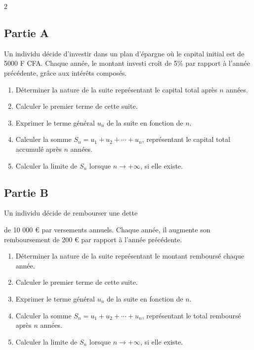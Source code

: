 \documentclass[12pt,a4paper]{article}
\begin{document}
\begin{multicols}{2}
\subsection*{Partie A}

Un individu décide d’investir dans un plan d’épargne où le capital initial est de 5000 F CFA. Chaque année, le montant investi croît de 5\% par rapport à l’année précédente, grâce aux intérêts composés.

\begin{enumerate}
    \item Déterminer la nature de la suite représentant le capital total après \(n\) années.
    \item Calculer le premier terme de cette suite.
    \item Exprimer le terme général \(u_n\) de la suite en fonction de \(n\).
    \item Calculer la somme \(S_n = u_1 + u_2 + \cdots + u_n\), représentant le capital total accumulé après \(n\) années.
    \item Calculer la limite de \(S_n\) lorsque \(n \to +\infty\), si elle existe.
\end{enumerate}

\subsection*{Partie B}

Un individu décide de rembourser une dette

de 10 000 € par versements annuels. Chaque année, il augmente son remboursement de 200 € par rapport à l’année précédente.

\begin{enumerate}
    \item Déterminer la nature de la suite représentant le montant remboursé chaque année.
    \item Calculer le premier terme de cette suite.
    \item Exprimer le terme général \(u_n\) de la suite en fonction de \(n\).
    \item Calculer la somme \(S_n = u_1 + u_2 + \cdots + u_n\), représentant le total remboursé après \(n\) années.
    \item Calculer la limite de \(S_n\) lorsque \(n \to +\infty\), si elle existe.
\end{enumerate} 
\end{multicols}
\end{document}
